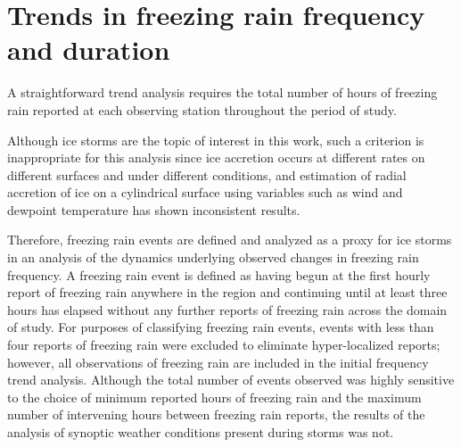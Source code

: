 \documentclass[twocol]{ametsoc}
\begin{document}
\section{Trends in freezing rain frequency and duration}
A straightforward trend analysis requires the total number of hours of freezing rain reported at each observing station throughout the period of study.  

Although ice storms are the topic of interest in this work, such a criterion is inappropriate for this analysis since ice accretion occurs at different rates on different surfaces and under different conditions, and estimation of radial accretion of ice on a cylindrical surface using variables such as wind and dewpoint temperature has shown inconsistent results. 

Therefore, freezing rain events are defined and analyzed as a proxy for ice storms in an analysis of the dynamics underlying observed changes in freezing rain frequency. A freezing rain event is defined as having begun at the first hourly report of freezing rain anywhere in the region and continuing until at least three hours has elapsed without any further reports of freezing rain across the domain of study. For purposes of classifying freezing rain events, events with less than four reports of freezing rain were excluded to eliminate hyper-localized reports; however, all observations of freezing rain are included in the initial frequency trend analysis. Although the total number of events observed was highly sensitive to the choice of minimum reported hours of freezing rain and the maximum number of intervening hours between freezing rain reports, the results of the analysis of synoptic weather conditions present during storms was not.
\end{document}
